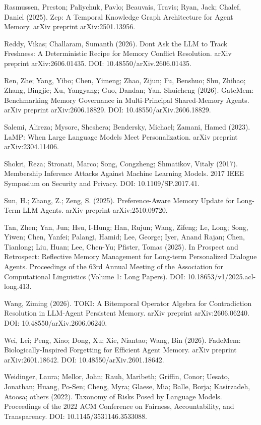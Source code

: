 Rasmussen, Preston; Paliychuk, Pavlo; Beauvais, Travis; Ryan, Jack;
Chalef, Daniel (2025). Zep: A Temporal Knowledge Graph Architecture for
Agent Memory. arXiv preprint arXiv:2501.13956.

Reddy, Vikas; Challaram, Sumanth (2026). Don\textquotesingle t Ask the
LLM to Track Freshness: A Deterministic Recipe for Memory Conflict
Resolution. arXiv preprint arXiv:2606.01435. DOI:
10.48550/arXiv.2606.01435.

Ren, Zhe; Yang, Yibo; Chen, Yimeng; Zhao, Zijun; Fu, Benshuo; Shu,
Zhihao; Zhang, Bingjie; Xu, Yangyang; Guo, Dandan; Yan, Shuicheng
(2026). GateMem: Benchmarking Memory Governance in Multi-Principal
Shared-Memory Agents. arXiv preprint arXiv:2606.18829. DOI:
10.48550/arXiv.2606.18829.

Salemi, Alireza; Mysore, Sheshera; Bendersky, Michael; Zamani, Hamed
(2023). LaMP: When Large Language Models Meet Personalization. arXiv
preprint arXiv:2304.11406.

Shokri, Reza; Stronati, Marco; Song, Congzheng; Shmatikov, Vitaly
(2017). Membership Inference Attacks Against Machine Learning Models.
2017 IEEE Symposium on Security and Privacy. DOI: 10.1109/SP.2017.41.

Sun, H.; Zhang, Z.; Zeng, S. (2025). Preference-Aware Memory Update for
Long-Term LLM Agents. arXiv preprint arXiv:2510.09720.

Tan, Zhen; Yan, Jun; Hsu, I-Hung; Han, Rujun; Wang, Zifeng; Le, Long;
Song, Yiwen; Chen, Yanfei; Palangi, Hamid; Lee, George; Iyer, Anand
Rajan; Chen, Tianlong; Liu, Huan; Lee, Chen-Yu; Pfister, Tomas (2025).
In Prospect and Retrospect: Reflective Memory Management for Long-term
Personalized Dialogue Agents. Proceedings of the 63rd Annual Meeting of
the Association for Computational Linguistics (Volume 1: Long Papers).
DOI: 10.18653/v1/2025.acl-long.413.

Wang, Ziming (2026). TOKI: A Bitemporal Operator Algebra for
Contradiction Resolution in LLM-Agent Persistent Memory. arXiv preprint
arXiv:2606.06240. DOI: 10.48550/arXiv.2606.06240.

Wei, Lei; Peng, Xiao; Dong, Xu; Xie, Niantao; Wang, Bin (2026). FadeMem:
Biologically-Inspired Forgetting for Efficient Agent Memory. arXiv
preprint arXiv:2601.18642. DOI: 10.48550/arXiv.2601.18642.

Weidinger, Laura; Mellor, John; Rauh, Maribeth; Griffin, Conor; Uesato,
Jonathan; Huang, Po-Sen; Cheng, Myra; Glaese, Mia; Balle, Borja;
Kasirzadeh, Atoosa; others (2022). Taxonomy of Risks Posed by Language
Models. Proceedings of the 2022 ACM Conference on Fairness,
Accountability, and Transparency. DOI: 10.1145/3531146.3533088.


